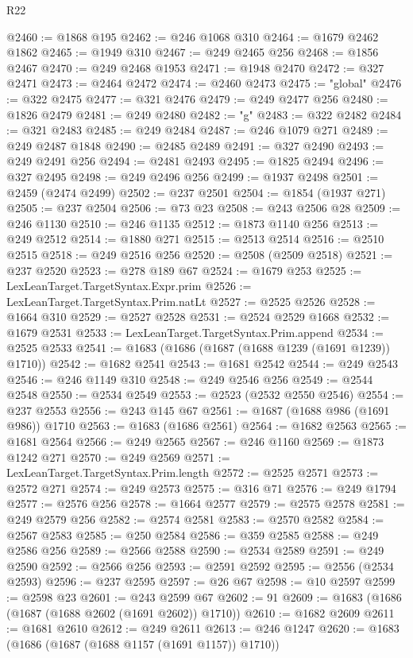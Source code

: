 \begin{lexlean}{R22}
\begin{coremodule}
@2460 := @1868 @195
@2462 := @246 @1068 @310
@2464 := @1679 @2462 @1862
@2465 := @1949 @310
@2467 := @249 @2465 @256
@2468 := @1856 @2467
@2470 := @249 @2468 @1953
@2471 := @1948 @2470
@2472 := @327 @2471
@2473 := @2464 @2472
@2474 := @2460 @2473
@2475 := "global"
@2476 := @322 @2475
@2477 := @321 @2476
@2479 := @249 @2477 @256
@2480 := @1826 @2479
@2481 := @249 @2480
@2482 := "g"
@2483 := @322 @2482
@2484 := @321 @2483
@2485 := @249 @2484
@2487 := @246 @1079 @271
@2489 := @249 @2487 @1848
@2490 := @2485 @2489
@2491 := @327 @2490
@2493 := @249 @2491 @256
@2494 := @2481 @2493
@2495 := @1825 @2494
@2496 := @327 @2495
@2498 := @249 @2496 @256
@2499 := @1937 @2498
@2501 := @2459 (@2474 @2499)
@2502 := @237 @2501
@2504 := @1854 (@1937 @271)
@2505 := @237 @2504
@2506 := @73 @23
@2508 := @243 @2506 @28
@2509 := @246 @1130
@2510 := @246 @1135
@2512 := @1873 @1140 @256
@2513 := @249 @2512
@2514 := @1880 @271
@2515 := @2513 @2514
@2516 := @2510 @2515
@2518 := @249 @2516 @256
@2520 := @2508 (@2509 @2518)
@2521 := @237 @2520
@2523 := @278 @189 @67
@2524 := @1679 @253
@2525 := LexLeanTarget.TargetSyntax.Expr.prim
@2526 := LexLeanTarget.TargetSyntax.Prim.natLt
@2527 := @2525 @2526
@2528 := @1664 @310
@2529 := @2527 @2528
@2531 := @2524 @2529 @1668
@2532 := @1679 @2531
@2533 := LexLeanTarget.TargetSyntax.Prim.append
@2534 := @2525 @2533
@2541 := @1683 (@1686 (@1687 (@1688 @1239 (@1691 @1239)) @1710))
@2542 := @1682 @2541
@2543 := @1681 @2542
@2544 := @249 @2543
@2546 := @246 @1149 @310
@2548 := @249 @2546 @256
@2549 := @2544 @2548
@2550 := @2534 @2549
@2553 := @2523 (@2532 @2550 @2546)
@2554 := @237 @2553
@2556 := @243 @145 @67
@2561 := @1687 (@1688 @986 (@1691 @986)) @1710
@2563 := @1683 (@1686 @2561)
@2564 := @1682 @2563
@2565 := @1681 @2564
@2566 := @249 @2565
@2567 := @246 @1160
@2569 := @1873 @1242 @271
@2570 := @249 @2569
@2571 := LexLeanTarget.TargetSyntax.Prim.length
@2572 := @2525 @2571
@2573 := @2572 @271
@2574 := @249 @2573
@2575 := @316 @71
@2576 := @249 @1794
@2577 := @2576 @256
@2578 := @1664 @2577
@2579 := @2575 @2578
@2581 := @249 @2579 @256
@2582 := @2574 @2581
@2583 := @2570 @2582
@2584 := @2567 @2583
@2585 := @250 @2584
@2586 := @359 @2585
@2588 := @249 @2586 @256
@2589 := @2566 @2588
@2590 := @2534 @2589
@2591 := @249 @2590
@2592 := @2566 @256
@2593 := @2591 @2592
@2595 := @2556 (@2534 @2593)
@2596 := @237 @2595
@2597 := @26 @67
@2598 := @10 @2597
@2599 := @2598 @23
@2601 := @243 @2599 @67
@2602 := 91
@2609 := @1683 (@1686 (@1687 (@1688 @2602 (@1691 @2602)) @1710))
@2610 := @1682 @2609
@2611 := @1681 @2610
@2612 := @249 @2611
@2613 := @246 @1247
@2620 := @1683 (@1686 (@1687 (@1688 @1157 (@1691 @1157)) @1710))

\end{coremodule}
\end{lexlean}
